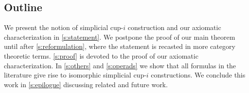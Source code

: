 
\subsection*{Outline}

We present the notion of simplicial \mbox{cup-$i$} construction and our axiomatic characterization in \cref{s:statement}.
We postpone the proof of our main theorem until after \cref{s:reformulation}, where the statement is recasted in more category theoretic terms.
\cref{s:proof} is devoted to the proof of our axiomatic characterization.
In \cref{s:others} and \cref{s:operads} we show that all formulas in the literature give rise to isomorphic simplicial \mbox{cup-$i$} constructions.
We conclude this work in \cref{s:epilogue} discussing related and future work.